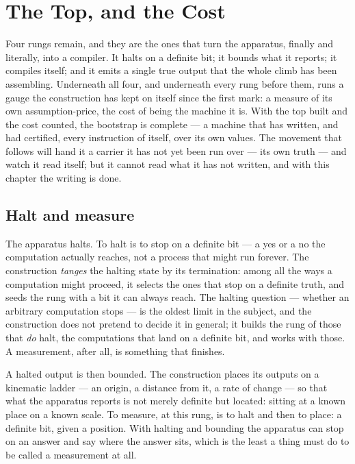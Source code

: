 \chapter{The Top, and the Cost}
\label{chap:the-top-and-the-cost}

Four rungs remain, and they are the ones that turn the apparatus, finally and literally, into a compiler.
It halts on a definite bit; it bounds what it reports; it compiles itself; and it emits a single true
output that the whole climb has been assembling. Underneath all four, and underneath every rung before
them, runs a gauge the construction has kept on itself since the first mark: a measure of its own
assumption-price, the cost of being the machine it is. With the top built and the cost counted, the
bootstrap is complete --- a machine that has written, and had certified, every instruction of itself, over
its own values. The movement that follows will hand it a carrier it has not yet been run over --- its own
truth --- and watch it read itself; but it cannot read what it has not written, and with this chapter the
writing is done.

\section{Halt and measure}
\label{se:halt-and-measure}

The apparatus halts. To halt is to stop on a definite bit --- a yes or a no the computation actually
reaches, not a process that might run forever. The construction \emph{tanges} the halting state by its
termination: among all the ways a computation might proceed, it selects the ones that stop on a definite
truth, and seeds the rung with a bit it can always reach. The halting question --- whether an arbitrary
computation stops --- is the oldest limit in the subject, and the construction does not pretend to decide
it in general; it builds the rung of those that \emph{do} halt, the computations that land on a definite
bit, and works with those. A measurement, after all, is something that finishes.

A halted output is then bounded. The construction places its outputs on a kinematic ladder --- an origin, a
distance from it, a rate of change --- so that what the apparatus reports is not merely definite but
located: sitting at a known place on a known scale. To measure, at this rung, is to halt and then to place:
a definite bit, given a position. With halting and bounding the apparatus can stop on an answer and say
where the answer sits, which is the least a thing must do to be called a measurement at all.

